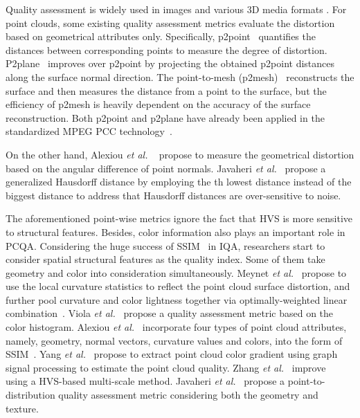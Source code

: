 \documentclass[acmsmall]{acmart}
\begin{document}
\par Quality assessment is widely used in images \cite{Jiang2020IQA1,Jiang2018IQA2} and various 3D media formats \cite{Min2020LF,Zhang2021NR1,Zhang2021NR2,Jiang2020SIQA}. For point clouds, some existing quality assessment metrics evaluate the distortion based on geometrical attributes only. Specifically, p2point~\cite{cignoni1998metro} quantifies the distances between corresponding points to measure the degree of distortion. P2plane~\cite{Mekuria2016Evaluation} improves over p2point by projecting the obtained p2point distances along the surface normal direction. The point-to-mesh (p2mesh)~\cite{Tian2017Evaluation} reconstructs the surface and then measures the distance from a point to the surface, but the efficiency of p2mesh is heavily dependent on the accuracy of the surface reconstruction. Both p2point and p2plane have already been applied in the standardized MPEG PCC technology~\cite{MPEGSoft}.

\par On the other hand, Alexiou \emph{et al.} ~\cite{alexiou2018pointt} propose to measure the geometrical distortion based on the angular difference of point normals. Javaheri \emph{et al.}~\cite{javaheri2020haus} propose a generalized Hausdorff distance by employing the th lowest distance instead of the biggest distance to address that Hausdorff distances are over-sensitive to noise.


\par The aforementioned point-wise metrics ignore the fact that HVS is more sensitive to structural features. Besides, color information also plays an important role in PCQA. Considering the huge success of SSIM~\cite{wang2004image} in IQA, researchers start to consider spatial structural features as the quality index. Some of them take geometry and color into consideration simultaneously. Meynet \emph{et al.}~\cite{meynet2019pcmsdm} propose to use the local curvature statistics to reflect the point cloud surface distortion, and further pool curvature and color lightness together via optimally-weighted linear combination~\cite{meynet2020pcmd}. Viola \emph{et al.}~\cite{viol2020acolor} propose a quality assessment metric based on the color histogram.  Alexiou \emph{et al.}~\cite{alexiou2020TowardsStructural} incorporate four types of point cloud attributes, namely, geometry, normal vectors, curvature values and colors, into the form of SSIM~\cite{wang2004image}. Yang \emph{et al.}~\cite{yang2020graphsim} propose to extract point cloud color gradient using graph signal processing to estimate the point cloud quality. Zhang \emph{et al.}~\cite{Zhang2021MSGraphSIM} improve~\cite{yang2020graphsim} using a HVS-based multi-scale method. Javaheri \emph{et al.}~\cite{javaheri2021PTD} propose a point-to-distribution quality assessment metric considering both the geometry and texture.
\end{document}
